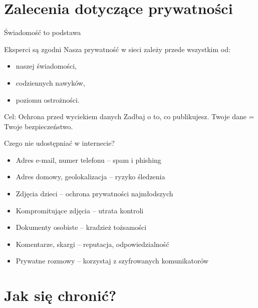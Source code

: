 \section{Zalecenia dotyczące prywatności}

\begin{frame}{Świadomość to podstawa}
\begin{alertblock}{Eksperci są zgodni}
Nasza prywatność w sieci zależy przede wszystkim od:
\begin{itemize}
    \item naszej świadomości,
    \item codziennych nawyków,
    \item poziomu ostrożności.
\end{itemize}
\end{alertblock}
\pause
\begin{exampleblock}{Cel: Ochrona przed wyciekiem danych}
Zadbaj o to, co publikujesz. Twoje dane = Twoje bezpieczeństwo.
\end{exampleblock}
\end{frame}

\begin{frame}{Czego nie udostępniać w internecie?}
\begin{itemize}
    \item Adres e-mail, numer telefonu – spam i phishing
    \item Adres domowy, geolokalizacja – ryzyko śledzenia
    \item Zdjęcia dzieci – ochrona prywatności najmłodszych
    \item Kompromitujące zdjęcia – utrata kontroli
    \item Dokumenty osobiste – kradzież tożsamości
    \item Komentarze, skargi – reputacja, odpowiedzialność
    \item Prywatne rozmowy – korzystaj z szyfrowanych komunikatorów
\end{itemize}
\end{frame}

\section{Jak się chronić?}

